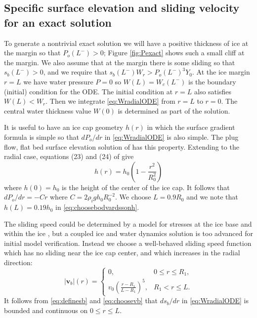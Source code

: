 \documentclass[11pt,final]{amsart}
\newcommand\bv{\mathbf{v}}
\begin{document}
\subsection*{Specific surface elevation and sliding velocity for an exact solution}  To generate a nontrivial exact solution we will have a positive thickness of ice at the margin so that $P_o(L^-)>0$; Figure \ref{fig:Pexact} shows such a small cliff at the margin.  We also assume that at the margin there is some sliding so that $s_b(L^-)>0$, and we require that $s_b(L^-) W_r > P_o(L^-)^3 Y_0$.  At the ice margin $r=L$ we have water pressure $P=0$ so $W(L)=W_c(L^-)$ is the boundary (initial) condition for the ODE.  The initial condition at $r=L$ also satisfies $W(L) < W_r$.  Then we integrate \eqref{eq:WradialODE} from $r=L$ to $r=0$.  The central water thickness value $W(0)$ is determined as part of the solution.

It is useful to have an ice cap geometry $h(r)$ in which the surface gradient formula is simple so that $dP_o/dr$ in \eqref{eq:WradialODE} is also simple.  The plug flow, flat bed surface elevation solution of \cite{Bodvardsson} has this property.  Extending to the radial case, equations (23) and (24) of \citep{Bodvardsson} give
\begin{equation}
h(r) = h_0 \left(1 - \frac{r^2}{R_0^2} \right) \label{eq:choosebodvardssonh}
\end{equation}
where $h(0)=h_0$ is the height of the center of the ice cap.  It follows that $dP_o/dr = - C r$ where $C=2\rho_i g h_0 R_0^{-2}$.  We choose $L=0.9 R_0$ and we note that $h(L)=0.19 h_0$ in \eqref{eq:choosebodvardssonh}.

The sliding speed could be determined by a model for stresses at the ice base and within the ice \citep{GreveBlatter2009}, but a coupled ice and water dynamics solution is too advanced for initial model verification.  Instead we choose a well-behaved sliding speed function which has no sliding near the ice cap center, and which increases in the radial direction:
\begin{equation}
|\bv_b|(r) = \begin{cases} 0, & 0 \le r \le R_1, \\
                           v_0  \left(\frac{r-R_1}{L-R_1}\right)^5, & R_1 < r \le L.
             \end{cases}  \label{eq:choosevb}
\end{equation}
It follows from \eqref{eq:definesb} and \eqref{eq:choosevb} that $ds_b/dr$ in \eqref{eq:WradialODE} is bounded and continuous on $0\le r \le L$.
\end{document}
